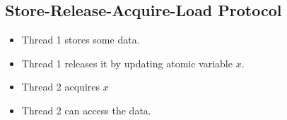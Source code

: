 \subsection{Store-Release-Acquire-Load Protocol}
\begin{itemize}
    \item Thread 1 stores some data.
    \item Thread 1 releases it by updating atomic variable $x$.
    \item Thread 2 acquires $x$
    \item Thread 2 can access the data.
\end{itemize}
